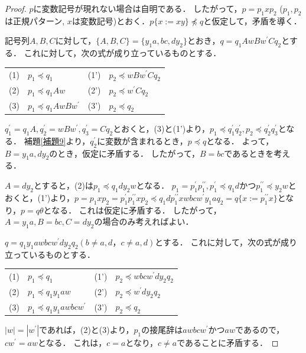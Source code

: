 \begin{proof}
$p$に変数記号が現れない場合は自明である．
したがって，$p=p_{1}xp_{2}$ ($p_{1}, p_{2}$は正規パターン, $x$は変数記号)とおく．$p \{ x := xy \} \not \preceq q$と仮定して，矛盾を導く．

記号列$A,B,C$に対して，$\{ A,B,C \} = \{ y_{1}a,bc,dy_{2} \}$とおき，$q=q_{1}AwBw^{\prime}Cq_{2}$とする．
これに対して，次の式が成り立っているものとする．
\smallskip

\begin{tabular}{llll}
(1) & $p_{1} \preceq q_{1}$ & (1') & $p_{2} \preceq wBw^{\prime}Cq_{2}$ \\
(2) & $p_{1} \preceq q_{1}Aw$ & (2') & $p_{2} \preceq w^{\prime}Cq_{2}$ \\
(3) & $p_{1} \preceq q_{1}AwBw^{\prime}$ & (3') & $p_{2} \preceq q_{2}$
\end{tabular}
\smallskip

$q^{\prime}_{1}=q_{1}A, q^{\prime}_{2}=wBw^{\prime}, q^{\prime}_{3}=Cq_{2}$とおくと，(3)と(1')より，$p_{1} \preceq q^{\prime}_{1}q^{\prime}_{2}, p_{2} \preceq q^{\prime}_{2}q^{\prime}_{3}$となる．
補題\ref{補題9}より，$q^{\prime}_{2}$に変数が含まれるとき，$p \preceq q$となる．
よって，$B=y_{1}a,dy_{2}$のとき，仮定に矛盾する．
したがって，$B=bc$であるときを考える．

$A=dy_{2}$とすると，(2)は$p_{1} \preceq q_{1}dy_{2}w$となる．
$p_{1}=p^{\prime}_{1}p^{\prime\prime}_{1}, p^{\prime}_{1} \preceq q_{1}d$かつ$p^{\prime\prime}_{1} \preceq y_{2}w$とおくと，(1')より，$p=p_{1}xp_{2}=p^{\prime}_{1}p^{\prime\prime}_{1}xp_{2} \preceq q_{1}dp^{\prime\prime}_{1}xwbcw^{\prime}y_{1}aq_{2}=q \{ x:=p^{\prime\prime}_{1}x \}$となり，$p=q\theta$となる．
これは仮定に矛盾する．
したがって，$A=y_{1}a,B=bc,C=dy_{2}$の場合のみ考えればよい．

$q=q_{1}y_{1}awbcw^{\prime}dy_{2}q_{2} (b \not = a,d，c \not = a,d)$とする．
これに対して，次の式が成り立っているものとする．
\smallskip

\begin{tabular}{llll}
(1) & $p_{1} \preceq q_{1}$ & (1') & $p_{2} \preceq wbcw^{\prime}dy_{2}q_{2}$ \\
(2) & $p_{1} \preceq q_{1}y_{1}aw$ & (2') & $p_{2} \preceq w^{\prime}dy_{2}q_{2}$ \\
(3) & $p_{1} \preceq q_{1}y_{1}awbcw^{\prime}$ & (3') & $p_{2} \preceq q_{2}$
\end{tabular}
\smallskip

$|w|=|w^{\prime}|$であれば，(2)と(3)より，$p_{1}$の接尾辞は$awbcw^{\prime}$かつ$aw$であるので，$cw^{\prime}=aw$となる．
これは，$c=a$となり，$c \not = a$であることに矛盾する．


\end{proof}
